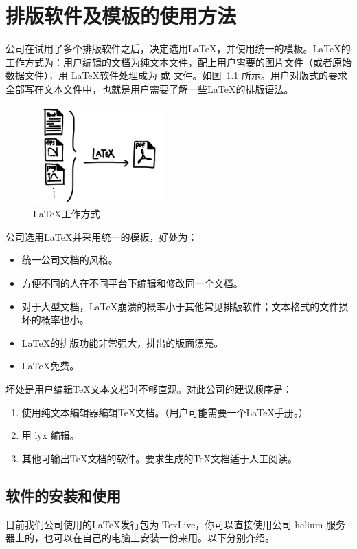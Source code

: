 \chapter{排版软件及模板的使用方法}
公司在试用了多个排版软件之后，决定选用\LaTeX ，并使用统一的模板。\LaTeX 的工作方式为：用户编辑的文档为纯文本文件，配上用户需要的图片文件（或者原始数据文件），用 \LaTeX 软件处理成为  或  文件。如图~\ref{latex} 所示。用户对版式的要求全部写在文本文件中，也就是用户需要了解一些\LaTeX 的排版语法。

\begin{figure}[htbp]\centering
\includegraphics[width=0.45\textwidth]{latex_wm.jpg} 
\caption{\label{latex}\LaTeX 工作方式}
\end{figure}

公司选用\LaTeX 并采用统一的模板，好处为：
\begin{itemize}
\item 统一公司文档的风格。
\item 方便不同的人在不同平台下编辑和修改同一个文档。
\item 对于大型文档，\LaTeX 崩溃的概率小于其他常见排版软件；文本格式的文件损坏的概率也小。
\item \LaTeX 的排版功能非常强大，排出的版面漂亮。
\item \LaTeX 免费。
\end{itemize}
坏处是用户编辑\TeX 文本文档时不够直观。对此公司的建议顺序是：
\begin{enumerate}
\item 使用纯文本编辑器编辑\TeX 文档。（用户可能需要一个\LaTeX 手册\cite{oetiker1995not}。）
\item 用 lyx 编辑。
\item 其他可输出\TeX 文档的软件。要求生成的\TeX 文档适于人工阅读。
\end{enumerate}

\section{软件的安装和使用}
目前我们公司使用的\LaTeX 发行包为 TexLive，你可以直接使用公司 helium 服务器上的，也可以在自己的电脑上安装一份来用。以下分别介绍。

